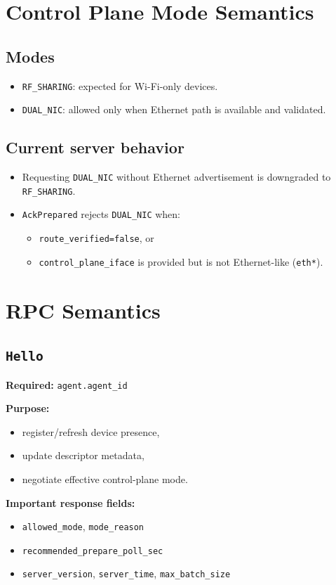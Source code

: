 \documentclass[11pt,a4paper]{article}
\begin{document}
\section{Control Plane Mode Semantics}
\subsection{Modes}
\begin{itemize}
  \item \texttt{RF\_SHARING}: expected for Wi-Fi-only devices.
  \item \texttt{DUAL\_NIC}: allowed only when Ethernet path is available and validated.
\end{itemize}

\subsection{Current server behavior}
\begin{itemize}
  \item Requesting \texttt{DUAL\_NIC} without Ethernet advertisement is downgraded to \texttt{RF\_SHARING}.
  \item \texttt{AckPrepared} rejects \texttt{DUAL\_NIC} when:
    \begin{itemize}
      \item \texttt{route\_verified=false}, or
      \item \texttt{control\_plane\_iface} is provided but is not Ethernet-like (\texttt{eth*}).
    \end{itemize}
\end{itemize}

\section{RPC Semantics}
\subsection{\texttt{Hello}}
\textbf{Required:} \texttt{agent.agent\_id}

\textbf{Purpose:}
\begin{itemize}
  \item register/refresh device presence,
  \item update descriptor metadata,
  \item negotiate effective control-plane mode.
\end{itemize}

\textbf{Important response fields:}
\begin{itemize}
  \item \texttt{allowed\_mode}, \texttt{mode\_reason}
  \item \texttt{recommended\_prepare\_poll\_sec}
  \item \texttt{server\_version}, \texttt{server\_time}, \texttt{max\_batch\_size}
\end{itemize}
\end{document}
